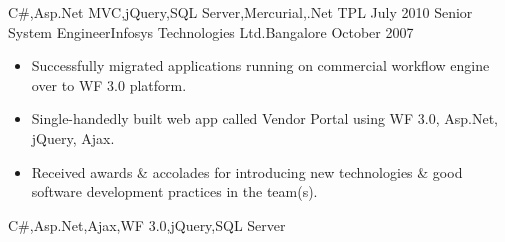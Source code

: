 \begin{experiences}
{\begin{itemize}
                      \end{itemize}
                  }
                  {C\#,Asp.Net MVC,jQuery,SQL Server,Mercurial,.Net TPL} 
  \emptySeparator         
  \experience
  {July 2010}  {Senior System Engineer}{Infosys Technologies Ltd.}{Bangalore}
  {October 2007}   {
				  	\begin{itemize}                                         
				  		\item Successfully migrated applications running on commercial workflow engine over to WF 3.0 platform.
				  		\item Single-handedly built web app called Vendor Portal using WF 3.0, Asp.Net, jQuery, Ajax.
				  		\item Received awards \& accolades for introducing new technologies \& good software development practices in the team(s).\\
				  	\end{itemize}
				  }
  				  {C\#,Asp.Net,Ajax,WF 3.0,jQuery,SQL Server}
\end{experiences}
